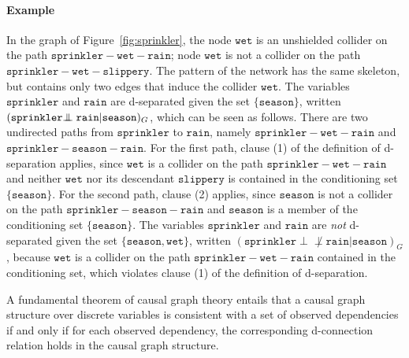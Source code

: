 \documentclass{elsarticle}%
\newcommand{\indep}{\ensuremath{\perp{}\!\!\!\!\!\!\!\perp{}}}
\newcommand{\dep}{\ensuremath{{\perp{}\!\!\!\!\!\!\!\not  \perp{}}}}
\newcommand{\G}{G}
\newcommand{\rain}{\mathtt{rain}}
\newcommand{\wet}{\mathtt{wet}}
\newcommand{\sprinkler}{\mathtt{sprinkler}}
\newcommand{\slippery}{\mathtt{slippery}}
\newcommand{\season}{\mathtt{season}}
\begin{document}
\paragraph{Example} In the graph of Figure~\ref{fig:sprinkler}, the node $\mathtt{wet}$ is an unshielded collider on the path
$\mathtt{sprinkler}-\mathtt{wet}-\mathtt{rain}$; node
$\mathtt{wet}$ is not a collider on the path $\mathtt{sprinkler}-\mathtt{wet}%
-\mathtt{slippery}$. The pattern of the network has the same skeleton, but
contains only two edges that induce the collider $\mathtt{wet}$. The variables $\mathtt{sprinkler}$ and $\mathtt{rain}$ are d-separated given the set $\{\season\}$, written $(\sprinkler \protect{\indep} \rain|\season)_{\G}$, which can be seen as follows. There are two undirected paths from $\sprinkler$ to $\rain$, namely $\sprinkler-\wet-\rain$ and $\sprinkler-\season-\rain$. For the first path, clause (1) of the definition of d-separation applies, since $\wet$ is a collider on the path $\sprinkler-\wet-\rain$ and neither $\wet$ nor its descendant $\slippery$ is  contained in the conditioning set $\{\season\}$. For the second path, clause (2) applies, since $\season$ is not  a collider on the path $\sprinkler-\season-\rain$ and $\season$ is a member of the conditioning set $\{\season\}$. The variables $\mathtt{sprinkler}$ and $\mathtt{rain}$ are {\em not} d-separated given the set $\{\season,\wet\}$, written $(\sprinkler \dep \rain|\season)_{\G}$, because $\wet$ is a collider on the path $\sprinkler-\wet-\rain$ contained in the conditioning set, which violates clause (1) of the definition of d-separation.

A fundamental theorem of causal graph theory entails that a causal graph structure over discrete variables is consistent with a set of observed dependencies if and only if for each observed dependency, the corresponding d-connection relation holds in the causal graph structure. 



%

\end{document}
